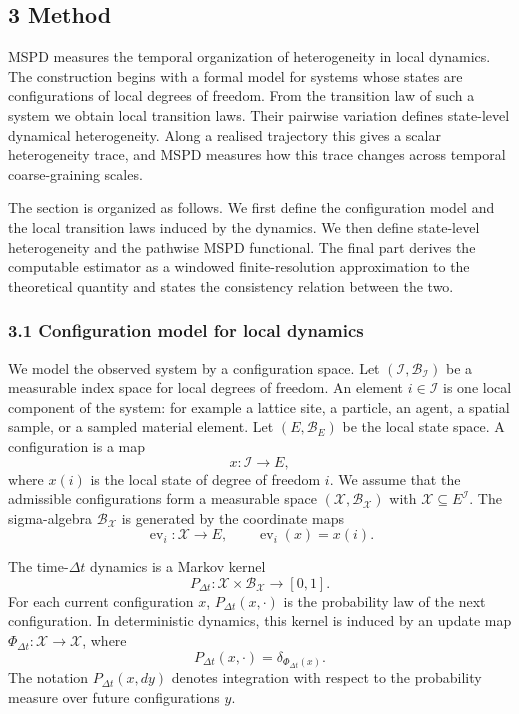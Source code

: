\subsection{3 Method}
\label{method}

MSPD measures the temporal organization of heterogeneity in local dynamics.  The construction begins with a formal model for systems whose states are configurations of local degrees of freedom.  From the transition law of such a system we obtain local transition laws.  Their pairwise variation defines state-level dynamical heterogeneity.  Along a realised trajectory this gives a scalar heterogeneity trace, and MSPD measures how this trace changes across temporal coarse-graining scales.

The section is organized as follows.  We first define the configuration model and the local transition laws induced by the dynamics.  We then define state-level heterogeneity and the pathwise MSPD functional.  The final part derives the computable estimator as a windowed finite-resolution approximation to the theoretical quantity and states the consistency relation between the two.

\subsubsection*{3.1 Configuration model for local dynamics}
\label{method:system-model}

We model the observed system by a configuration space.  Let
\((\mathcal I,\mathcal B_{\mathcal I})\) be a measurable index space for local degrees of freedom.  An element \(i\in\mathcal I\) is one local component of the system: for example a lattice site, a particle, an agent, a spatial sample, or a sampled material element.  Let \((E,\mathcal B_E)\) be the local state space.  A configuration is a map
\[
  x:\mathcal I\to E,
\]
where \(x(i)\) is the local state of degree of freedom \(i\).  We assume that the admissible configurations form a measurable space \((\mathcal X,\mathcal B_{\mathcal X})\) with \(\mathcal X\subseteq E^{\mathcal I}\).  The sigma-algebra \(\mathcal B_{\mathcal X}\) is generated by the coordinate maps
\[
  \operatorname{ev}_i:\mathcal X\to E,
  \qquad
  \operatorname{ev}_i(x)=x(i).
\]

The time-\(\Delta t\) dynamics is a Markov kernel
\[
  P_{\Delta t}:\mathcal X\times\mathcal B_{\mathcal X}\to[0,1].
\]
For each current configuration \(x\), \(P_{\Delta t}(x,\cdot)\) is the probability law of the next configuration.  In deterministic dynamics, this kernel is induced by an update map \(\Phi_{\Delta t}:\mathcal X\to\mathcal X\), where
\[
  P_{\Delta t}(x,\cdot)=\delta_{\Phi_{\Delta t}(x)}.
\]
The notation \(P_{\Delta t}(x,dy)\) denotes integration with respect to the probability measure over future configurations \(y\).

